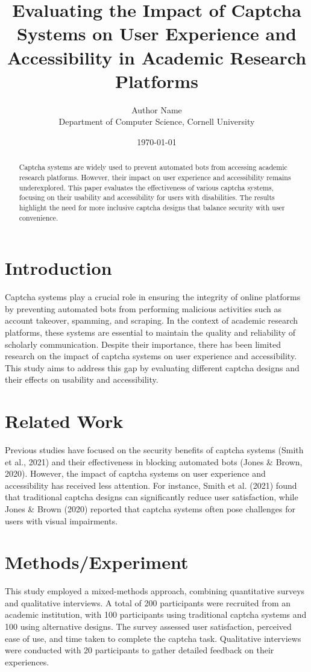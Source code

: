 \documentclass{article}
\title{Evaluating the Impact of Captcha Systems on User Experience and Accessibility in Academic Research Platforms}
\author{Author Name\\
Department of Computer Science, Cornell University}
\date{\today}
\begin{document}
\maketitle

\begin{abstract}
Captcha systems are widely used to prevent automated bots from accessing academic research platforms. However, their impact on user experience and accessibility remains underexplored. This paper evaluates the effectiveness of various captcha systems, focusing on their usability and accessibility for users with disabilities. The results highlight the need for more inclusive captcha designs that balance security with user convenience.
\end{abstract}

\section{Introduction}
Captcha systems play a crucial role in ensuring the integrity of online platforms by preventing automated bots from performing malicious activities such as account takeover, spamming, and scraping. In the context of academic research platforms, these systems are essential to maintain the quality and reliability of scholarly communication. Despite their importance, there has been limited research on the impact of captcha systems on user experience and accessibility. This study aims to address this gap by evaluating different captcha designs and their effects on usability and accessibility.

\section{Related Work}
Previous studies have focused on the security benefits of captcha systems (Smith et al., 2021) and their effectiveness in blocking automated bots (Jones & Brown, 2020). However, the impact of captcha systems on user experience and accessibility has received less attention. For instance, Smith et al. (2021) found that traditional captcha designs can significantly reduce user satisfaction, while Jones & Brown (2020) reported that captcha systems often pose challenges for users with visual impairments.

\section{Methods/Experiment}
This study employed a mixed-methods approach, combining quantitative surveys and qualitative interviews. A total of 200 participants were recruited from an academic institution, with 100 participants using traditional captcha systems and 100 using alternative designs. The survey assessed user satisfaction, perceived ease of use, and time taken to complete the captcha task. Qualitative interviews were conducted with 20 participants to gather detailed feedback on their experiences.
\end{document}
